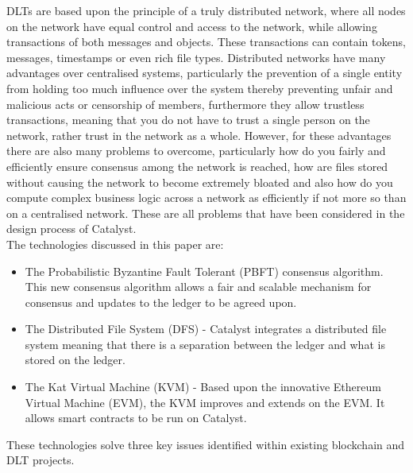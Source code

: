 DLTs are based upon the principle of a truly distributed network, where all nodes on the network have equal control and access to the network, while allowing transactions of both messages and objects. These transactions can contain tokens, messages, timestamps or even rich file types. Distributed networks have many advantages over centralised systems, particularly the prevention of a single entity from holding too much influence over the system thereby preventing unfair and malicious acts or censorship of members, furthermore they allow trustless transactions, meaning that you do not have to trust a single person on the network, rather trust in the network as a whole. However, for these advantages there are also many problems to overcome, particularly how do you fairly and efficiently ensure consensus among the network is reached, how are files stored without causing the network to become extremely bloated and also how do you compute complex business logic across a network as efficiently if not more so than on a centralised network. These are all problems that have been considered in the design process of Catalyst. \\

The technologies discussed in this paper are:

\begin{itemize}
\item The Probabilistic Byzantine Fault Tolerant (PBFT) consensus algorithm. This new consensus algorithm allows a fair and scalable mechanism for consensus and updates to the ledger to be agreed upon.
\item The Distributed File System (DFS) - Catalyst integrates a distributed file system meaning that there is a separation between the ledger and what is stored on the ledger.
\item The Kat Virtual Machine (KVM) - Based upon the innovative Ethereum Virtual Machine (EVM), the KVM improves and extends on the EVM. It allows smart contracts to be run on Catalyst. \\
\end{itemize}

These technologies solve three key issues identified within existing blockchain and DLT projects. \\

